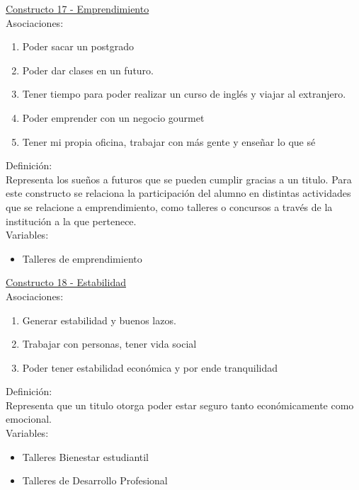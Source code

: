 \underline {Constructo 17 - Emprendimiento} \\
Asociaciones:
\begin{enumerate}
	\item Poder sacar un postgrado
	\item Poder dar clases en un futuro.
	\item Tener tiempo para poder realizar un curso de inglés y viajar al extranjero.
	\item Poder emprender con un negocio gourmet
	\item Tener mi propia oficina, trabajar con más gente y enseñar lo que sé	
\end{enumerate}

Definición:\\

Representa los sueños a futuros que se pueden cumplir gracias a un titulo. Para este constructo se relaciona la participación del alumno en distintas actividades que se relacione a emprendimiento, como talleres o concursos a través de la institución a la que pertenece.\\

Variables:\\
\begin{itemize}
	\item Talleres de emprendimiento	
\end{itemize} 

\underline {Constructo 18 - Estabilidad} \\
Asociaciones:
\begin{enumerate}
	\item Generar estabilidad y buenos lazos.
	\item Trabajar con personas, tener vida social 	
	\item Poder tener estabilidad económica y por ende tranquilidad
\end{enumerate}

Definición:\\

Representa que un titulo otorga poder estar seguro tanto económicamente como emocional.\\

Variables:\\
\begin{itemize}
	\item Talleres Bienestar estudiantil
	\item Talleres de Desarrollo Profesional	
\end{itemize} 


